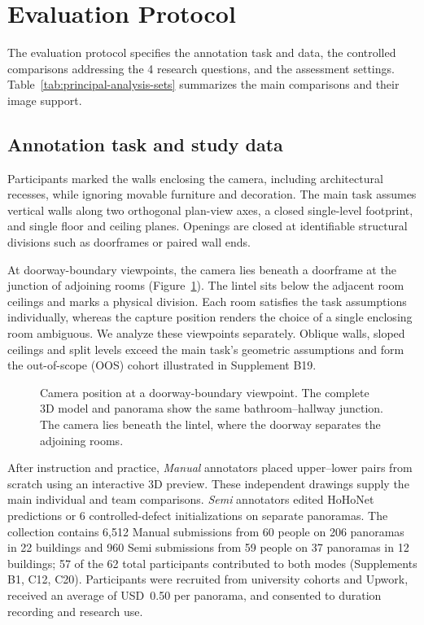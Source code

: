 \section{Evaluation Protocol}
\label{sec:study-design}

The evaluation protocol specifies the annotation task and data, the controlled comparisons addressing the 4 research questions, and the assessment settings. Table~\ref{tab:principal-analysis-sets} summarizes the main comparisons and their image support.

\subsection{Annotation task and study data}
\label{sec:task-data}

Participants marked the walls enclosing the camera, including architectural recesses, while ignoring movable furniture and decoration. The main task assumes vertical walls along two orthogonal plan-view axes, a closed single-level footprint, and single floor and ceiling planes. Openings are closed at identifiable structural divisions such as doorframes or paired wall ends.

At doorway-boundary viewpoints, the camera lies beneath a doorframe at the junction of adjoining rooms (Figure~\ref{fig:doorway-setting}). The lintel sits below the adjacent room ceilings and marks a physical division. Each room satisfies the task assumptions individually, whereas the capture position renders the choice of a single enclosing room ambiguous. We analyze these viewpoints separately. Oblique walls, sloped ceilings and split levels exceed the main task's geometric assumptions and form the out-of-scope (OOS) cohort illustrated in Supplement B19.

\begin{figure}[!ht]
\centering
\setcounter{subfigure}{0}
\begin{minipage}{\columnwidth}
\centering
{}%
\hfill%
\end{minipage}
\caption{Camera position at a doorway-boundary viewpoint. The complete 3D model and panorama show the same bathroom--hallway junction. The camera lies beneath the lintel, where the doorway separates the adjoining rooms.}
\label{fig:doorway-setting}
\end{figure}

After instruction and practice, \textit{Manual} annotators placed upper--lower pairs from scratch using an interactive 3D preview. These independent drawings supply the main individual and team comparisons. \textit{Semi} annotators edited HoHoNet predictions \cite{hohonet2021} or 6 controlled-defect initializations on separate panoramas. The collection contains 6,512 Manual submissions from 60 people on 206 panoramas in 22 buildings and 960 Semi submissions from 59 people on 37 panoramas in 12 buildings; 57 of the 62 total participants contributed to both modes (Supplements B1, C12, C20). Participants were recruited from university cohorts and Upwork, received an average of USD~0.50 per panorama, and consented to duration recording and research use.

